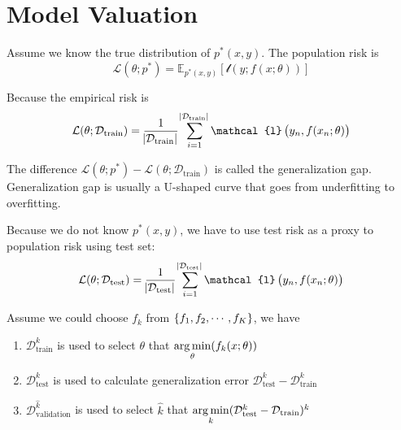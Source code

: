 \section{Model Valuation}

\begin{definition}
    Assume we know the true distribution of $p^*(x,y)$. The population risk is
    \begin{equation}
        \mathcal{L}(\theta;p^*) = \mathbb{E}_{p^*(x,y)}\left[\mathcal{l}\left(y; f(x;\theta) \right)\right]
    \end{equation}
\end{definition}

\begin{definition}
    Because the empirical risk is 
    \begin{equation}
        \mathcal{L}(\theta;\mathcal{D}_{\text{train}}) = \frac{1}{\absolutevalue{\mathcal{D}_{\text{train}}}} \sum_{i=1}^{\absolutevalue{\mathcal{D}_{\text{train}}}} \mathcal{l}\left( y_n, f(x_n; \theta) \right)
    \end{equation}
    
    The difference $\mathcal{L}(\theta;p^*) - \mathcal{L}(\theta;\mathcal{D}_{\text{train}})$ is called the generalization gap. Generalization gap is usually a U-shaped curve that goes from underfitting to overfitting.
    
    Because we do not know $p^*(x,y)$, we have to use test risk as a proxy to population risk using test set:
    \begin{equation}
        \mathcal{L}(\theta;\mathcal{D}_{\text{test}}) = \frac{1}{\absolutevalue{\mathcal{D}_{\text{test}}}} \sum_{i=1}^{\absolutevalue{\mathcal{D}_{\text{test}}}} \mathcal{l}\left( y_n, f(x_n; \theta) \right)
    \end{equation}
\end{definition}

Assume we could choose $f_k$ from $\set{f_1, f_2, \cdots, f_K}$, we have
\begin{enumerate}
    \item $\mathcal{D}_{\text{train}}^k$ is used to select $\theta$ that $\mathop{\arg\min}\limits_{\theta}(f_k(x;\theta))$
    \item $\mathcal{D}_{\text{test}}^k$ is used to calculate generalization error $\mathcal{D}_{\text{test}}^k - \mathcal{D}_{\text{train}}^k$
    \item $\mathcal{D}_{\text{validation}}^{\hat{k}}$ is used to select $\hat{k}$ that $\mathop{\arg\min}\limits_{k}(\mathcal{D}_{\text{test}}^k - \mathcal{D}_{\text{train}})^k$
\end{enumerate}


